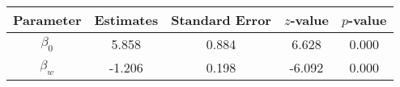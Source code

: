 \begin{table}[ht]
\centering
\begin{tabular}{ccccc}
  \hline
Parameter & Estimates & Standard Error & $z$-value & $p$-value \\ 
  \hline
$\beta_0$ & 5.858 & 0.884 & 6.628 & 0.000 \\ 
  $\beta_w$ & -1.206 & 0.198 & -6.092 & 0.000 \\ 
   \hline
\end{tabular}
\end{table}
